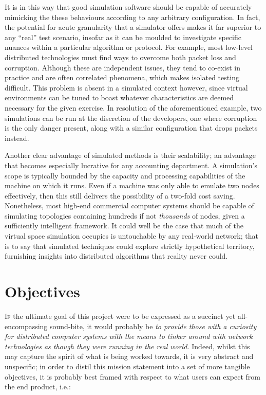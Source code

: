 It is in this way that good simulation software should be capable of accurately mimicking the these behaviours
according to any arbitrary configuration. In fact, the potential for acute granularity that a simulator offers makes
it far superior to any ``real'' test scenario, insofar as it can be moulded to investigate specific nuances within a
particular algorithm or protocol. For example, most low-level distributed technologies must find ways to overcome
both packet loss and corruption. Although these are independent issues, they tend to co-exist in practice and are
often correlated phenomena, which makes isolated testing difficult. This problem is absent in a simulated context
however, since virtual environments can be tuned to boast whatever characteristics are deemed necessary for
the given exercise. In resolution of the aforementioned example, two simulations can be run at the discretion of the
developers, one where corruption is the only danger present, along with a similar configuration that drops packets
instead.

Another clear advantage of simulated methods is their scalability; an advantage that becomes especially lucrative for
any accounting department. A simulation's scope is typically bounded by the capacity and processing capabilities of
the machine on which it runs. Even if a machine was only able to emulate two nodes effectively, then this still
delivers the possibility of a two-fold cost saving. Nonetheless, most high-end commercial computer systems should be
capable of simulating topologies containing hundreds if not \emph{thousands} of nodes, given a sufficiently
intelligent framework. It could well be the case that much of the virtual space simulation occupies is untouchable by
any real-world network; that is to say that simulated techniques could explore strictly hypothetical territory,
furnishing insights into distributed algorithms that reality never could.


\section{Objectives}\label{section:objectives}

\lettrine{I}{f} the ultimate goal of this project were to be expressed as a succinct yet all-encompassing sound-bite,
it would probably be \emph{to provide those with a curiosity for distributed computer systems with the means to tinker
around with network technologies as though they were running in the real world.} Indeed, whilst this may capture the
spirit of what is being worked towards, it is very abstract and unspecific; in order to distil this
mission statement into a set of more tangible objectives, it is probably best framed with respect to what users can
expect from the end product, i.e.:

